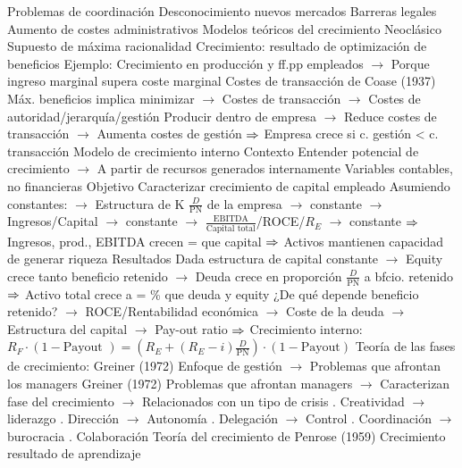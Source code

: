 \documentclass{nuevotema}
\begin{document}
\begin{esquemal}
				\4 Problemas de coordinación
				\4 Desconocimiento nuevos mercados
				\4 Barreras legales
				\4 Aumento de costes administrativos
		\2 Modelos teóricos del crecimiento
			\3 Neoclásico
				\4 Supuesto de máxima racionalidad
				\4 Crecimiento:
				\4[] resultado de optimización de beneficios
				\4 Ejemplo:
				\4[] Crecimiento en producción y ff.pp empleados
				\4[] $\to$ Porque ingreso marginal supera coste marginal
				\4 Costes de transacción de Coase (1937)
				\4[] Máx. beneficios implica minimizar
				\4[] $\to$ Costes de transacción
				\4[] $\to$ Costes de autoridad/jerarquía/gestión
				\4[] Producir dentro de empresa
				\4[] $\to$ Reduce costes de transacción
				\4[] $\to$ Aumenta costes de gestión
				\4[] $\Rightarrow$ Empresa crece si c. gestión < c. transacción
			\3 Modelo de crecimiento interno
				\4 Contexto
				\4[] Entender potencial de crecimiento
				\4[] $\to$ A partir de recursos generados internamente
				\4[] Variables contables, no financieras
				\4 Objetivo
				\4[] Caracterizar crecimiento de capital empleado
				\4[] Asumiendo constantes:
				\4[] $\to$ Estructura de K $\frac{D}{\text{PN}}$ de la empresa $\to$ constante
				\4[] $\to$ Ingresos/Capital $\to$ constante
				\4[] $\to$ $\frac{\text{EBITDA}}{\text{Capital total}}$/ROCE/$R_E$ $\to$ constante
				\4[] $\Rightarrow$ Ingresos, prod., EBITDA crecen = que capital
				\4[] $\Rightarrow$ Activos mantienen capacidad de generar riqueza
				\4 Resultados
				\4[] Dada estructura de capital constante
				\4[] $\to$ Equity crece tanto beneficio retenido
				\4[] $\to$ Deuda crece en proporción $\frac{D}{\text{PN}}$ a bfcio. retenido
				\4[] $\Rightarrow$ Activo total crece a = \% que deuda y equity
				\4[] ¿De qué depende beneficio retenido?
				\4[] $\to$ ROCE/Rentabilidad económica
				\4[] $\to$ Coste de la deuda
				\4[] $\to$ Estructura del capital
				\4[] $\to$ Pay-out ratio
				\4[] $\Rightarrow$ $\text{Crecimiento interno}$:
				\4[] \quad $R_F \cdot (1-\text{Payout })=\left( R_E + (R_E - i)\frac{D}{\text{PN}} \right) \cdot (1- \text{Payout})$
			\3 Teoría de las fases de crecimiento: Greiner (1972)
				\4 Enfoque de gestión
				\4[] $\to$ Problemas que afrontan los managers
				\4 Greiner (1972)
				\4[] Problemas que afrontan managers
				\4[] $\to$ Caracterizan fase del crecimiento
				\4[] $\to$ Relacionados con un tipo de crisis
				. Creatividad $\to$ liderazgo
				. Dirección $\to$ Autonomía
				. Delegación $\to$ Control
				. Coordinación $\to$ burocracia
				. Colaboración
			\3 Teoría del crecimiento de Penrose (1959)
				\4 Crecimiento resultado de aprendizaje

\end{esquemal}
\end{document}
